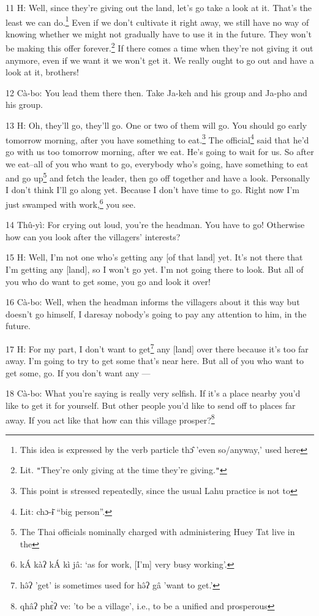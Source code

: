 11 H: Well, since they're giving out the land, let's go take a look at it. That's
the least we can do.\footnote{This idea is expressed by the verb particle thɔ̂ 'even so/anyway,' used here} Even if we don't cultivate it right away, we still have
no way of knowing whether we might not gradually have to use it in the future.
They won't be making this offer forever.\footnote{Lit. \texttt{"}They're only giving at the time they're giving.\texttt{"}} If there comes a time when they're
not giving it out anymore, even if we want it we won't get it. We really ought
to go out and have a look at it, brothers!

12 Cà-bo: You lead them there then. Take Ja-keh and his group and Ja-pho and his
group.

13 H: Oh, they'll go, they'll go. One or two of them will go. You should go early
tomorrow morning, after you have something to eat.\footnote{This point is stressed repeatedly, since the usual Lahu practice is not to} The official\footnote{Lit: chɔ-ɨ̄ ``big person''.} said that
he'd go with us too tomorrow morning, after we eat. He's going to wait for us.
So after we eat--all of you who want to go, everybody who's going, have something
to eat and go up\footnote{The Thai officials nominally charged with administering Huey Tat live in the} and fetch the leader, then go off together and have a look.
Personally I don't think I'll go along yet. Because I don't have time to go. Right
now I'm just swamped with work,\footnote{kÁ kàʔ kÁ kì jâ: `as for work, [I'm] very busy working'.} you see.

14 Thû-yì: For crying out loud, you're the headman. You have to go! Otherwise
how can you look after the villagers' interests?

15 H: Well, I'm not one who's getting any [of that land] yet. It's not there that
I'm getting any [land], so I won't go yet. I'm not going there to look. But all
of you who do want to get some, you go and look it over!

16 Cà-bo: Well, when the headman informs the villagers about it this way but doesn't
go himself, I daresay nobody's going to pay any attention to him, in the future.

17 H: For my part, I don't want to get\footnote{hə̂ʔ 'get' is sometimes used for hə̂ʔ gâ 'want to get.'} any [land] over there because it's too
far away. I'm going to try to get some that's near here. But all of you who want
to get some, go. If you don't want any ---

18 Cà-bo: What you're saying is really very selfish. If it's a place nearby you'd
like to get it for yourself. But other people you'd like to send off to places
far away. If you act like that how can this village prosper?\footnote{qhâʔ phɛ̀ʔ ve: 'to be a village', i.e., to be a unified and prosperous}

